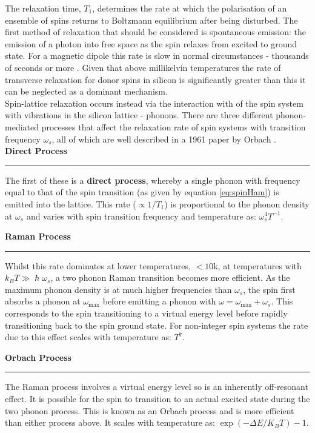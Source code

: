 The relaxation time, $T_1$, determines the rate at which the polarisation of an ensemble of spins returns to Boltzmann equilibrium after being disturbed.
The first method of relaxation that should be considered is spontaneous emission: the emission of a photon into free space as the spin relaxes from excited to ground state. 
For a magnetic dipole this rate is slow in normal circumstances - thousands of seconds or more \cite{schweiger2001principles,Baranov2017}. 
Given that above millikelvin temperatures the rate of transverse relaxation for donor spins in silicon is significantly greater than this it can be neglected as a dominant mechanism.
\\
Spin-lattice relaxation occurs instead via the interaction with of the spin system with vibrations in the silicon lattice - phonons. 
There are three different phonon-mediated processes that affect the relaxation rate of spin systems with transition frequency $\omega_s$, all of which are well described in a 1961 paper by Orbach \cite{VanVleck1940,Orbach1961}.
\\
\textbf{Direct Process}
\\
\noindent\rule{\columnwidth}{1pt}
\begin{adjustwidth}{1.5cm}{}
The first of these is a \textbf{direct process}, whereby a single phonon with frequency equal to that of the spin transition (as given by equation \ref{eq:spinHam}) is emitted into the lattice. 
This rate ($\propto 1/T_1$) is proportional to the phonon density at $\omega_s$ and varies with spin transition frequency and temperature as: $\omega_s^4T^{-1}$.
\par
\par
\end{adjustwidth}
\textbf{Raman Process}
\par\noindent\rule{\columnwidth}{1pt}
\begin{adjustwidth}{1.5cm}{}
Whilst this rate dominates at lower temperatures, $<10$k, at temperatures with $k_BT \gg \hslash\omega_s$, a two phonon Raman transition becomes more efficient.
As the maximum phonon density is at much higher frequencies than $\omega_s$, the spin first absorbs a phonon at $\omega_{\text{max}}$ before emitting a phonon with $\omega = \omega_{\text{max}} + \omega_s$. 
This corresponds to the spin transitioning to a virtual energy level before rapidly transitioning back to the spin ground state.
For non-integer spin systems the rate due to this effect scales with temperature as: $T^{7}$.
\end{adjustwidth}
\textbf{Orbach Process}
\\
\noindent\rule{\columnwidth}{1pt}
\begin{adjustwidth}{1.5cm}{}
The Raman process involves a virtual energy level so is an inherently off-resonant effect. 
It is possible for the spin to transition to an actual excited state during the two phonon process. 
This is known as an Orbach process and is more efficient than either process above. 
It scales with temperature as: $\exp\left({-\Delta E/K_BT}\right)-1$.
\end{adjustwidth}

